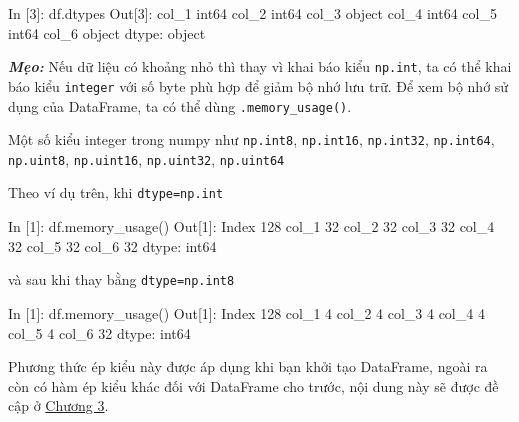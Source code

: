 \documentclass[
]{book}
\makeatletter
\newenvironment{Shaded}{\begin{snugshade}}{\end{snugshade}}
\newcommand{\BuiltInTok}[1]{#1}
\newcommand{\DecValTok}[1]{\textcolor[rgb]{0.00,0.00,0.81}{#1}}
\newcommand{\NormalTok}[1]{#1}
\newenvironment{kframe}{%
\medskip{}
\setlength{\fboxsep}{.8em}
 \def\at@end@of@kframe{}%
 \ifinner\ifhmode%
  \def\at@end@of@kframe{\end{minipage}}%
  \begin{minipage}{\columnwidth}%
 \fi\fi%
 \def\FrameCommand##1{\hskip\@totalleftmargin \hskip-\fboxsep
 \colorbox{shadecolor}{##1}\hskip-\fboxsep
     \hskip-\linewidth \hskip-\@totalleftmargin \hskip\columnwidth}%
 \MakeFramed {\advance\hsize-\width
   \@totalleftmargin\z@ \linewidth\hsize
   \@setminipage}}%
 {\par\unskip\endMakeFramed%
 \at@end@of@kframe}
\newenvironment{rmdblock}[1]
  {
  \begin{itemize}
  \renewcommand{\labelitemi}{
    \raisebox{-.7\height}[0pt][0pt]{
      {\setkeys{Gin}{width=3em,keepaspectratio}\texttt{[image: images/\#1]}}
    }
  }
  \setlength{\fboxsep}{1em}
  \begin{kframe}
  \item
  }
  {
  \end{kframe}
  \end{itemize}
  }
\newenvironment{rmdtip}
  {\begin{rmdblock}{tip}}
  {\end{rmdblock}}
\makeatother
\begin{document}
\begin{Shaded}
\begin{Highlighting}[]
\NormalTok{In [}\DecValTok{3}\NormalTok{]: df.dtypes}
\NormalTok{Out[}\DecValTok{3}\NormalTok{]:}
\NormalTok{col\_1     int64}
\NormalTok{col\_2     int64}
\NormalTok{col\_3    }\BuiltInTok{object}
\NormalTok{col\_4     int64}
\NormalTok{col\_5     int64}
\NormalTok{col\_6    }\BuiltInTok{object}
\NormalTok{dtype: }\BuiltInTok{object}
\end{Highlighting}
\end{Shaded}

\begin{rmdtip}
\textbf{\emph{Mẹo:}}
Nếu dữ liệu có khoảng nhỏ thì thay vì khai báo kiểu \texttt{np.int}, ta có thể khai báo kiểu \texttt{integer} với số byte phù hợp để giảm bộ nhớ lưu trữ.
Để xem bộ nhớ sử dụng của DataFrame, ta có thể dùng \texttt{.memory\_usage()}.

Một số kiểu integer trong numpy như \texttt{np.int8}, \texttt{np.int16}, \texttt{np.int32}, \texttt{np.int64}, \texttt{np.uint8}, \texttt{np.uint16}, \texttt{np.uint32}, \texttt{np.uint64}
\end{rmdtip}
Theo ví dụ trên, khi \texttt{dtype=np.int}

\begin{Shaded}
\begin{Highlighting}[]
\NormalTok{In [}\DecValTok{1}\NormalTok{]:  df.memory\_usage()}
\NormalTok{Out[}\DecValTok{1}\NormalTok{]: }
\NormalTok{Index    }\DecValTok{128}
\NormalTok{col\_1     }\DecValTok{32}
\NormalTok{col\_2     }\DecValTok{32}
\NormalTok{col\_3     }\DecValTok{32}
\NormalTok{col\_4     }\DecValTok{32}
\NormalTok{col\_5     }\DecValTok{32}
\NormalTok{col\_6     }\DecValTok{32}
\NormalTok{dtype: int64}
\end{Highlighting}
\end{Shaded}

và sau khi thay bằng \texttt{dtype=np.int8}

\begin{Shaded}
\begin{Highlighting}[]
\NormalTok{In [}\DecValTok{1}\NormalTok{]:  df.memory\_usage()}
\NormalTok{Out[}\DecValTok{1}\NormalTok{]: }
\NormalTok{Index    }\DecValTok{128}
\NormalTok{col\_1      }\DecValTok{4}
\NormalTok{col\_2      }\DecValTok{4}
\NormalTok{col\_3      }\DecValTok{4}
\NormalTok{col\_4      }\DecValTok{4}
\NormalTok{col\_5      }\DecValTok{4}
\NormalTok{col\_6     }\DecValTok{32}
\NormalTok{dtype: int64}
\end{Highlighting}
\end{Shaded}

Phương thức ép kiểu này được áp dụng khi bạn khởi tạo DataFrame, ngoài ra còn có hàm ép kiểu khác đối với DataFrame cho trước, nội dung này sẽ được đề cập ở \hyperref[Chuong-3]{Chương 3}.
\end{document}
